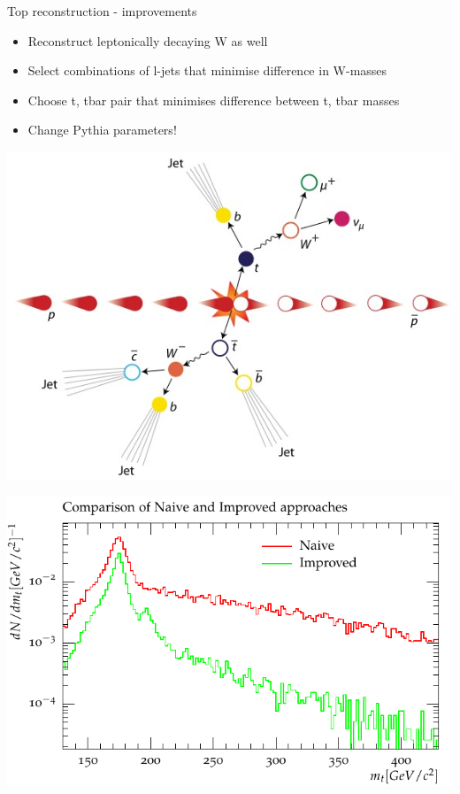 \documentclass{beamer}
\begin{document}
  \begin{frame}{Top reconstruction - improvements}
    \begin{itemize}
      \item Reconstruct leptonically decaying W as well
      \item Select combinations of l-jets that minimise difference in W-masses
      \item Choose t, tbar pair that minimises difference between t, tbar masses
      \item Change Pythia parameters!
    \end{itemize}
    \includegraphics[height=0.4\textheight]{ttbar.jpg}
  \end{frame}

  \begin{frame}
    \includegraphics[width=\textwidth]{comparison}
  \end{frame}
	
\end{document}
